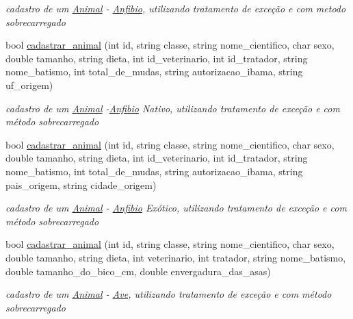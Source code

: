 \begin{DoxyCompactItemize}
\begin{DoxyCompactList}\small\item\em cadastro de um \mbox{\hyperlink{class_animal}{Animal}} -\/ \mbox{\hyperlink{class_anfibio}{Anfibio}}, utilizando tratamento de exceção e com metodo sobrecarregado \end{DoxyCompactList}\item 
bool \mbox{\hyperlink{class_sistema_a3c9d2decd44859a8f8eab34859539718}{cadastrar\+\_\+animal}} (int id, string classe, string nome\+\_\+cientifico, char sexo, double tamanho, string dieta, int id\+\_\+veterinario, int id\+\_\+tratador, string nome\+\_\+batismo, int total\+\_\+de\+\_\+mudas, string autorizacao\+\_\+ibama, string uf\+\_\+origem)
\begin{DoxyCompactList}\small\item\em cadastro de um \mbox{\hyperlink{class_animal}{Animal}} -\/\mbox{\hyperlink{class_anfibio}{Anfibio}} Nativo, utilizando tratamento de exceção e com método sobrecarregado \end{DoxyCompactList}\item 
bool \mbox{\hyperlink{class_sistema_abb027a54e2c84f92c6416f379654632a}{cadastrar\+\_\+animal}} (int id, string classe, string nome\+\_\+cientifico, char sexo, double tamanho, string dieta, int id\+\_\+veterinario, int id\+\_\+tratador, string nome\+\_\+batismo, int total\+\_\+de\+\_\+mudas, string autorizacao\+\_\+ibama, string pais\+\_\+origem, string cidade\+\_\+origem)
\begin{DoxyCompactList}\small\item\em cadastro de um \mbox{\hyperlink{class_animal}{Animal}} -\/ \mbox{\hyperlink{class_anfibio}{Anfibio}} Exótico, utilizando tratamento de exceção e com método sobrecarregado \end{DoxyCompactList}\item 
bool \mbox{\hyperlink{class_sistema_abe8cab13768dcc8cf90c9a0fe9663af0}{cadastrar\+\_\+animal}} (int id, string classe, string nome\+\_\+cientifico, char sexo, double tamanho, string dieta, int veterinario, int tratador, string nome\+\_\+batismo, double tamanho\+\_\+do\+\_\+bico\+\_\+cm, double envergadura\+\_\+das\+\_\+asas)
\begin{DoxyCompactList}\small\item\em cadastro de um \mbox{\hyperlink{class_animal}{Animal}} -\/ \mbox{\hyperlink{class_ave}{Ave}}, utilizando tratamento de exceção e com método sobrecarregado \end{DoxyCompactList}\item 

\end{DoxyCompactItemize}
